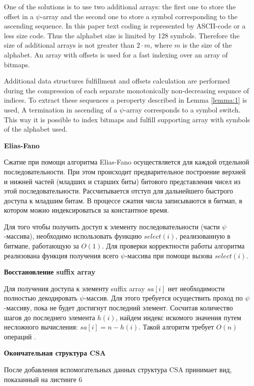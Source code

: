 One of the solutions is to use two additional arrays:
the first one to store the offset in a $\psi$-array and the second one to store a symbol
corresponding to the ascending sequence.
In this paper text coding is represented by ASCII-code or a less size code.
Thus the alphabet size is limited by 128 symbols. Therefore the size of additional arrays is not
greater than $2 \cdot m$, where $m$ is the size of the alphabet.
An array with offsets is used for a fast indexing over an array of bitmaps.

Additional data structures fulfillment and offsets calculation are performed during the compression
of each separate monotonically non-decreasing sequnce of indices.
To extract these sequences a peroperty described in Lemma \ref{lemma:1} is used,
A termination in ascending of a $\psi$-array corresponds to a symbol switch.
This way it is possible to index bitmaps and fulfill supporting array with symbols of the alphabet used.





\textbf{Elias-Fano}

Сжатие при помощи алгоритма Elias-Fano осуществляется для каждой отдельной последовательности.
При этом происходит предварительное построение верхней и нижней частей (младших и старших биты)
битового представления чисел из этой последовательности. Рассчитывается отступ для дальнейшего
быстрого доступа к младшим битам. В процессе сжатия числа записываются в битмап,
в котором можно индексироваться за константное время.

Для того чтобы получить доступ к элементу последовательности (части $\psi$-массива),
необходимо использовать функцию $select(i)$, реализованную в битмапе, работающую за $O(1)$.
Для проверки корректности работы алгоритма реализована функция получения всего $\psi$-массива
при помощи вызова $select(i)$.

\textbf{Восстановление suffix array}

Для получения доступа к элементу suffix array $sa[i]$ нет необходимости полностью декодировать
$\psi$-массив. Для этого требуется осуществить проход по $\psi$-массиву, пока не будет достигнут
последний элемент. Сосчитав количество шагов до последнего элемента $h(i)$, найдем индекс искомого
значения путем несложного вычисления: $sa[i] = n - h(i)$. Такой алгоритм требует $O(n)$ операций \cite{andersensimple}.

\textbf{Окончательная структура CSA}

После добавления вспомогательных данных структура CSA принимает вид, показанный на листинге 6


